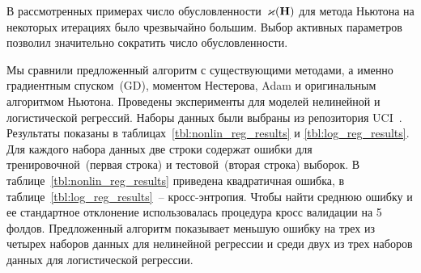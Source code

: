 В рассмотренных примерах число обусловленности~$\varkappa(\mathbf{H})$ для метода Ньютона на некоторых итерациях было чрезвычайно большим. 
Выбор активных параметров позволил значительно сократить число обусловленности. 

Мы сравнили предложенный алгоритм с существующими методами, а именно градиентным спуском~(GD), моментом Нестерова, Adam и оригинальным алгоритмом Ньютона. 
Проведены эксперименты для моделей нелинейной и логистической регрессий. 
Наборы данных были выбраны из репозитория UCI~\cite{uci2017}. 
Результаты показаны в таблицах~\ref{tbl:nonlin_reg_results} и \ref{tbl:log_reg_results}. 
Для каждого набора данных две строки содержат ошибки для тренировочной~(первая строка) и тестовой~(вторая строка) выборок. 
В таблице~\ref{tbl:nonlin_reg_results} приведена квадратичная ошибка, в таблице~\ref{tbl:log_reg_results}~-- кросс-энтропия.
Чтобы найти среднюю ошибку и ее стандартное отклонение использовалась процедура кросс валидации на 5 фолдов. 
Предложенный алгоритм показывает меньшую ошибку на трех из четырех наборов данных для нелинейной регрессии и среди двух из трех наборов данных для логистической регрессии.

